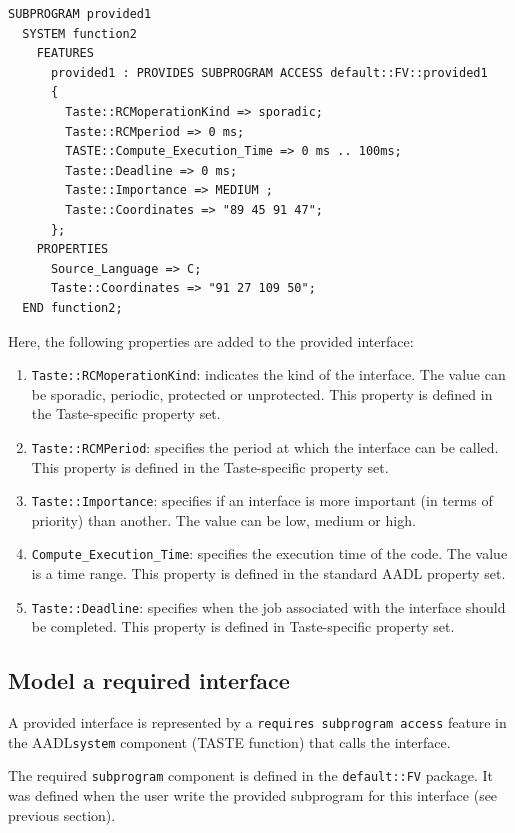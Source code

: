 \documentclass[11pt]{book}
\newcommand{\Concept}[1]{#1\xspace}
\newcommand{\aadl}{\Concept{AADL}}
\newcommand{\taste}{\Concept{TASTE}}
\begin{document}
      \begin{lstlisting}[language=aadl]
  SUBPROGRAM provided1
  SYSTEM function2
    FEATURES
      provided1 : PROVIDES SUBPROGRAM ACCESS default::FV::provided1
      {
        Taste::RCMoperationKind => sporadic;
        Taste::RCMperiod => 0 ms;
        TASTE::Compute_Execution_Time => 0 ms .. 100ms;
        Taste::Deadline => 0 ms;
        Taste::Importance => MEDIUM ;
        Taste::Coordinates => "89 45 91 47";
      };
    PROPERTIES
      Source_Language => C;
      Taste::Coordinates => "91 27 109 50";
  END function2;
  \end{lstlisting}
   Here, the following properties are added to the provided interface:
   \begin{enumerate}
      \item
         \texttt{Taste::RCMoperationKind}: indicates the kind of the interface.
         The value can be sporadic, periodic, protected or unprotected. This
         property is defined in the Taste-specific property set.
      \item
         \texttt{Taste::RCMPeriod}: specifies the period at which the interface
         can be called. This property is defined in the Taste-specific property
         set.
      \item
         \texttt{Taste::Importance}: specifies if an interface is more important
         (in terms of priority) than another. The value can be low, medium or
         high.
      \item
         \texttt{Compute\_Execution\_Time}: specifies the execution time of the
         code. The value is a time range. This property is defined in the
         standard \aadl property set.
      \item
         \texttt{Taste::Deadline}: specifies when the job associated with the interface
         should be completed. This property is defined in Taste-specific
         property set.
   \end{enumerate}

      \subsection{Model a required interface}
      A provided interface is represented by a
      \texttt{requires subprogram access} feature in the \aadl \texttt{system} 
      component (\taste function) that calls the interface.

      The required \texttt{subprogram} component is defined in the
      \texttt{default::FV} package. It was defined when the user write the
      provided subprogram for this interface (see previous section).
\end{document}
